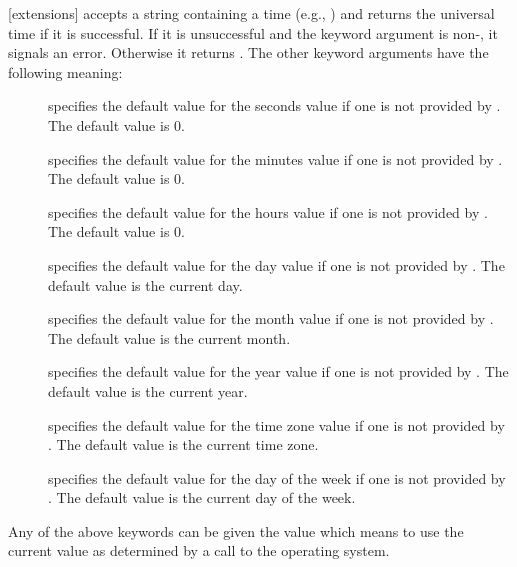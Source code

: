 [extensions]{
       }
 accepts a string containing a time (e.g., 
)
and returns the universal time if it is successful.  If it is unsuccessful
and the keyword argument  is non-\FALSE, it signals an
error.  Otherwise it returns \FALSE.  The other keyword arguments have the
following meaning:
\begin{description}

\item[]
specifies the default value for the seconds value if
one is not provided by .  The default value is 0.

\item[]
specifies the default value for the minutes value if
one is not provided by .  The default value is 0.

\item[]
specifies the default value for the hours value if
one is not provided by .  The default value is 0.

\item[]
specifies the default value for the day value if one is
not provided by .  The default value is the current day.

\item[]
specifies the default value for the month value if one
is not provided by .  The default value is the current
month.

\item[]
specifies the default value for the year value if one is
not provided by .  The default value is the current year.

\item[]
specifies the default value for the time zone value if
one is not provided by .  The default value is the current
time zone.

\item[]
specifies the default value for the day of the week
if one is not provided by .  The default value is the
current day of the week.
\end{description}
Any of the above keywords can be given the value  which means
to use the current value as determined by a call to the operating system.
\enddefun

